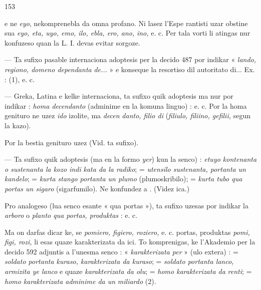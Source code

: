 \begin{VUpage}[157]{153}

\VUcontinue
e ne \textit{eyo}, nekomprenebla da omna profano. Ni lasez l'Espe\cc
rantisti uzar obstine sua \textit{eyo, eta, uyo, emo, ilo, ebla, ero, ano,}\nl
\textit{ino,} e. c. Per tala vorti li atingas nur konfuzeso quan la L. I.\nl
devas evitar sorgoze.

 --- Ta sufixo pasable internaciona adoptesis per la\nl
decido 487 por indikar « \textit{lando, regiono, domeno dependanta}\nl
\textit{de...} » e konseque la resortiso dil autoritato di... Ex. : \cc
{} (1),  e. c.\parplein

 --- Greka, Latina e kelke internaciona, ta sufixo quik\nl
adoptesis ma nur por indikar : \textit{homa decendanto} (adminime\nl
en la komuna linguo) : \cc
{} e. c. Por la homa genituro ne uzez \textit{ido} izolite, ma \textit{decen}\cc
\textit{danto, filio di} (\textit{filiulo, filiino, gefilii,} segun la kazo).

Por la bestia genituro uzez  (Vid. ta sufixo).

 --- Ta sufixo quik adoptesis (ma en la formo \textit{yer})\nl
kun la senco) : \textit{etuyo kontenanta o sustenanta la kozo indi}\cc
\textit{kata da la radiko};  = \textit{utensilo sustenanta, portanta}\nl
\textit{un kandelo};  = \textit{kurta stango portanta un plumo}\nl
(plumoskribilo);  = \textit{kurta tubo qua portas un sigaro}\nl
(sigarfumilo). Ne konfundez  a . (Videz ica.)

Pro analogeso (lua senco esante « qua portas »), ta sufixo\nl
uzesas por indikar la \textit{arboro} o \textit{planto qua portas, produktas} :\nl
{}\nl
{} e. c.

Ma on darfas dicar ke, se \textit{pomiero, figiero, roziero,} e. c.\nl
portas, produktas \textit{pomi, figi, rozi,} li esas quaze karakterizata\nl
da ici. To komprenigas, ke l'Akademio per la decido 592\nl
adjuntis a l'unesma senco : « \textit{karakterizata per} » (ulo extera) :\nl
{} = \textit{soldato portanta kuraso, karakterizata da kuraso};\nl
{} = \textit{soldato portanta lanco, armizita ye lanco} e quaze\nl
\textit{karakterizata da olu};  = \textit{homo karakterizata da}\nl
\textit{renti};  = \textit{homo karakterizata adminime da un}\nl
\textit{miliardo} (2).
\end{VUpage}

